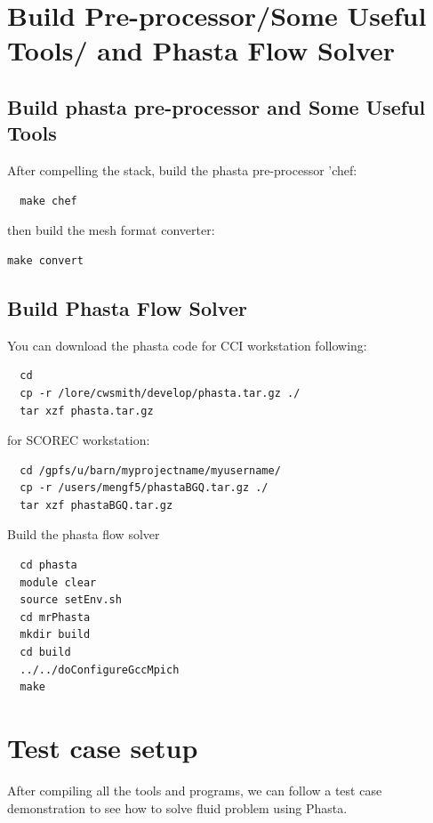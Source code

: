 \documentclass{article}
\begin{document}
\section{Build Pre-processor/Some Useful Tools/ and Phasta Flow Solver}

\subsection{Build phasta pre-processor and Some Useful Tools}

After compelling the stack, build the phasta pre-processor 'chef:
\begin{lstlisting}
  make chef
\end{lstlisting}

then build the mesh format converter:
\begin{lstlisting}
make convert 
\end{lstlisting}


\subsection{Build Phasta Flow Solver}

You can download the phasta code for CCI workstation following:
\begin{lstlisting}
  cd 
  cp -r /lore/cwsmith/develop/phasta.tar.gz ./
  tar xzf phasta.tar.gz
   \end{lstlisting}
for SCOREC workstation:
\begin{lstlisting}
  cd /gpfs/u/barn/myprojectname/myusername/
  cp -r /users/mengf5/phastaBGQ.tar.gz ./
  tar xzf phastaBGQ.tar.gz
   \end{lstlisting}
 
Build the phasta flow solver
\begin{lstlisting}
  cd phasta
  module clear
  source setEnv.sh
  cd mrPhasta
  mkdir build
  cd build
  ../../doConfigureGccMpich
  make
\end{lstlisting}


\section{Test case setup}

After compiling all the tools and programs, we can follow a test case demonstration to see how to solve fluid problem using Phasta. 
\end{document}

